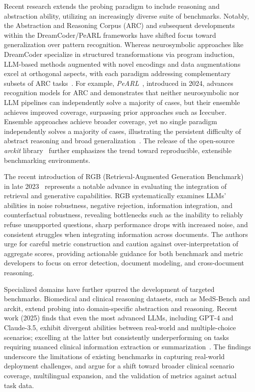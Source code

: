 \documentclass[sigconf]{acmart}
\begin{document}
Recent research extends the probing paradigm to include reasoning and abstraction ability, utilizing an increasingly diverse suite of benchmarks. Notably, the Abstraction and Reasoning Corpus (ARC) and subsequent developments within the DreamCoder/PeARL frameworks have shifted focus toward generalization over pattern recognition. Whereas neurosymbolic approaches like DreamCoder specialize in structured transformations via program induction, LLM-based methods augmented with novel encodings and data augmentations excel at orthogonal aspects, with each paradigm addressing complementary subsets of ARC tasks~\cite{ref91,ref92,ref95,ref105}. For example, \textit{PeARL}~\cite{ref92}, introduced in 2024, advances recognition models for ARC and demonstrates that neither neurosymbolic nor LLM pipelines can independently solve a majority of cases, but their ensemble achieves improved coverage, surpassing prior approaches such as Icecuber. Ensemble approaches achieve broader coverage, yet no single paradigm independently solves a majority of cases, illustrating the persistent difficulty of abstract reasoning and broad generalization~\cite{ref95,ref92,ref105}. The release of the open-source \textit{arckit} library~\cite{ref92} further emphasizes the trend toward reproducible, extensible benchmarking environments.

The recent introduction of RGB (Retrieval-Augmented Generation Benchmark) in late 2023~\cite{ref105} represents a notable advance in evaluating the integration of retrieval and generative capabilities. RGB systematically examines LLMs' abilities in noise robustness, negative rejection, information integration, and counterfactual robustness, revealing bottlenecks such as the inability to reliably refuse unsupported questions, sharp performance drops with increased noise, and consistent struggles when integrating information across documents. The authors urge for careful metric construction and caution against over-interpretation of aggregate scores, providing actionable guidance for both benchmark and metric developers to focus on error detection, document modeling, and cross-document reasoning.

Specialized domains have further spurred the development of targeted benchmarks. Biomedical and clinical reasoning datasets, such as MedS-Bench and arckit, extend probing into domain-specific abstraction and reasoning. Recent work (2025) finds that even the most advanced LLMs, including GPT-4 and Claude-3.5, exhibit divergent abilities between real-world and multiple-choice scenarios; excelling at the latter but consistently underperforming on tasks requiring nuanced clinical information extraction or summarization~\cite{ref95,ref92,ref105}. The findings underscore the limitations of existing benchmarks in capturing real-world deployment challenges, and argue for a shift toward broader clinical scenario coverage, multilingual expansion, and the validation of metrics against actual task data.
\end{document}
